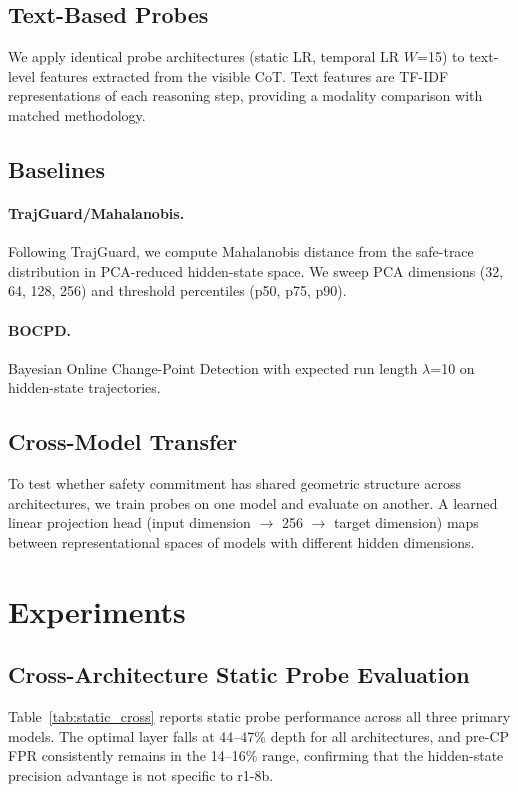 \documentclass[11pt,a4paper]{article}
\begin{document}
\subsection{Text-Based Probes}

We apply identical probe architectures (static LR, temporal LR $W$=15) to text-level features extracted from the visible CoT. Text features are TF-IDF representations of each reasoning step, providing a modality comparison with matched methodology.

\subsection{Baselines}

\paragraph{TrajGuard/Mahalanobis.}
Following TrajGuard, we compute Mahalanobis distance from the safe-trace distribution in PCA-reduced hidden-state space. We sweep PCA dimensions (32, 64, 128, 256) and threshold percentiles (p50, p75, p90).

\paragraph{BOCPD.}
Bayesian Online Change-Point Detection with expected run length $\lambda$=10 on hidden-state trajectories.

\subsection{Cross-Model Transfer}

To test whether safety commitment has shared geometric structure across architectures, we train probes on one model and evaluate on another. A learned linear projection head (input dimension $\to$ 256 $\to$ target dimension) maps between representational spaces of models with different hidden dimensions.

\section{Experiments}

\subsection{Cross-Architecture Static Probe Evaluation}

Table~\ref{tab:static_cross} reports static probe performance across all three primary models. The optimal layer falls at 44--47\% depth for all architectures, and pre-CP FPR consistently remains in the 14--16\% range, confirming that the hidden-state precision advantage is not specific to r1-8b.
\end{document}
